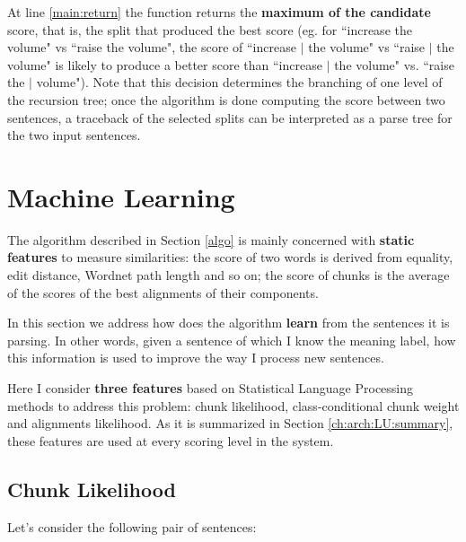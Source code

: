 At line \ref{main:return} the function returns the \textbf{maximum of the candidate} score, that is, the split that produced the best score (eg. for ``increase the volume" vs ``raise the volume", the score of ``increase $\vert$ the volume" vs ``raise $\vert$ the volume" is likely to produce a better score than ``increase $\vert$ the volume" vs. ``raise the $\vert$ volume"). Note that this decision determines the branching of one level of the recursion tree; once the algorithm is done computing the score between two sentences, a traceback of the selected splits can be interpreted as a parse tree for the two input sentences.


\section{Machine Learning} \label{learning}
The algorithm described in Section \ref{algo} is mainly concerned with \textbf{static features} to measure similarities: the score of two words is derived from equality, edit distance, Wordnet path length and so on; the score of chunks is the average of the scores of the best alignments of their components.

In this section we address how does the algorithm \textbf{learn} from the sentences it is parsing. In other words, given a sentence of which I know the meaning label, how this information is used to improve the way I process new sentences.

Here I consider \textbf{three features} based on Statistical Language Processing methods to address this problem: chunk likelihood, class-conditional chunk weight and alignments likelihood. As it is summarized in Section \ref{ch:arch:LU:summary}, these features are used at every scoring level in the system.

\subsection{Chunk Likelihood} \label{ch3:ml:cl}
Let's consider the following pair of sentences:
\vspace{-0.7cm}

